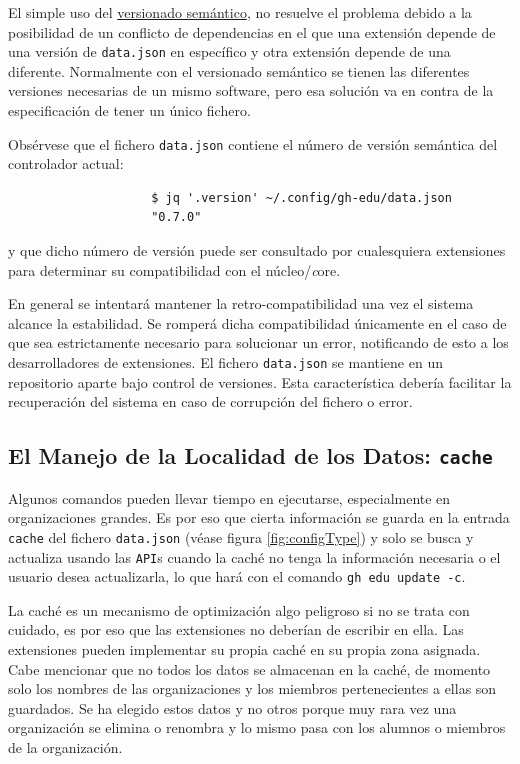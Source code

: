 El simple uso del \href{https://semver.org/lang/es/}{versionado semántico}, no resuelve el problema debido a la  posibilidad de un conflicto de dependencias en el que una extensión depende de una versión de \verb|data.json| en específico y otra extensión depende de una diferente. Normalmente con el versionado semántico se tienen las diferentes versiones necesarias de un mismo software, pero esa solución va en contra de la especificación de tener un único fichero. 


Obsérvese que el fichero \verb|data.json| contiene el número de versión semántica del controlador actual:

\begin{verbatim}
                    $ jq '.version' ~/.config/gh-edu/data.json 
                    "0.7.0"
\end{verbatim}

y que dicho número de versión puede ser consultado por cualesquiera extensiones para determinar su compatibilidad con el núcleo/{\emph core}.


En general se intentará mantener la retro-compatibilidad una vez el sistema alcance la estabilidad. Se romperá dicha compatibilidad únicamente en el caso de que sea estrictamente necesario para solucionar un error, notificando de esto a los desarrolladores de extensiones. El fichero \verb|data.json| se mantiene en un repositorio aparte bajo control de versiones. Esta característica debería facilitar la recuperación del sistema en caso de corrupción del fichero o error.


\subsection{El Manejo de la Localidad de los Datos: {\tt cache}}
Algunos comandos pueden llevar tiempo en ejecutarse, especialmente en organizaciones grandes. Es por eso que cierta información se guarda en la entrada \verb|cache| del fichero \verb|data.json| (véase  figura \ref{fig:configType}) y solo se busca y actualiza usando las \verb|API|s cuando la caché no tenga la información necesaria o el usuario desea actualizarla, lo que hará con el comando \verb|gh edu update -c|. 

La caché es un mecanismo de optimización algo peligroso si no se trata con cuidado, es por eso que las extensiones no deberían de escribir en ella. Las extensiones pueden implementar su propia caché en su propia zona asignada. Cabe mencionar que no todos los datos se almacenan en la caché, de momento solo los nombres de las organizaciones y los miembros pertenecientes a ellas son guardados. Se ha elegido estos datos y no otros porque muy rara vez una organización se elimina o renombra y lo mismo pasa con los alumnos o miembros de la organización.

